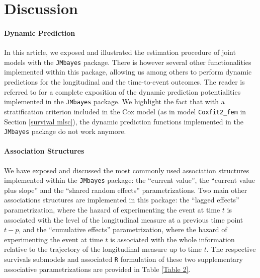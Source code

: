 \documentclass[12pt]{article}
\begin{document}
\section{Discussion}
\label{discussion}

\paragraph{Dynamic Prediction}
In this article, we exposed and illustrated the estimation procedure of joint models with the \texttt{JMbayes} package. There is however several other functionalities implemented within this package, allowing us among others to perform dynamic predictions for the longitudinal and the time-to-event outcomes. The reader is referred to \cite{JMbayes} for a complete exposition of the dynamic prediction potentialities implemented in the \texttt{JMbayes} package. We highlight the fact that with a stratification criterion included in the Cox model (as in model \texttt{Coxfit2\_fem} in Section \ref{survival mlsc}), the dynamic prediction functions implemented in the \texttt{JMbayes} package do not work anymore.

\paragraph{Association Structures}
We have exposed and discussed the most commonly used association structures implemented within the \texttt{JMbayes} package: the ``current value'', the ``current value plus slope'' and the ``shared random effects'' parametrizations. Two main other associations structures are implemented in this package: the ``lagged effects'' parametrization, where the hazard of experimenting the event at time $t$ is associated with the level of the longitudinal measure at a previous time point $t-p$, and the ``cumulative effects'' parametrization, where the hazard of experimenting the event at time $t$ is associated with the whole information relative to the trajectory of the longitudinal measure up to time $t$. The respective survivals submodels and associated \texttt{R} formulation of these two supplementary associative parametrizations are provided in Table \ref{Table 2}.
\end{document}
